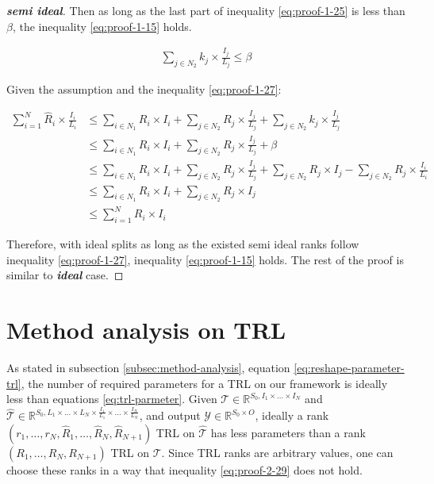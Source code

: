 \documentclass{article}
\begin{document}
\begin{proof}[\textbf{semi ideal}]
Then as long as the last part of inequality \ref{eq:proof-1-25} is less than $\beta$, the inequality \ref{eq:proof-1-15} holds.

\begin{align}
	\label{eq:proof-1-27}
	 \sum_{j\in N_2} k_j \times \frac{I_j}{L_j} \leq \beta
\end{align}

Given the assumption and the inequality \ref{eq:proof-1-27}:

\begin{align}
	\label{eq:proof-1-28}
	\sum_{i=1}^{N} \hat{R}_i \times \frac{I_i}{L_i} &\leq
	\sum_{i\in N_1} R_i \times I_i +  \sum_{j\in N_2} R_j \times \frac{I_j}{L_j} + \sum_{j\in N_2} k_j \times \frac{I_j}{L_j} 
	\nonumber\\
	&\leq
	\sum_{i\in N_1} R_i \times I_i +  \sum_{j\in N_2} R_j \times \frac{I_j}{L_j} + \beta
	\nonumber\\
	&\leq
	\sum_{i\in N_1} R_i \times I_i +  \sum_{j\in N_2} R_j \times \frac{I_j}{L_j} + \sum_{j \in N_2} R_j \times I_j -  \sum_{j\in N_2} R_j \times \frac{I_i}{L_i}
	\nonumber\\
	&\leq
	\sum_{i\in N_1} R_i \times I_i +  \sum_{j \in N_2} R_j \times I_j
	\nonumber \\
	&\leq 
	\sum_{i = 1}^{N}R_i \times I_i
\end{align}

Therefore, with ideal splits as long as the existed semi ideal ranks follow inequality \ref{eq:proof-1-27}, inequality \ref{eq:proof-1-15} holds. The rest of the proof is similar to \textit{\textbf{ideal}} case.
\end{proof}

\section{Method analysis on TRL}
\label{proof-2}
As stated in subsection \ref{subsec:method-analysis}, equation \ref{eq:reshape-parameter-trl}, the number of required parameters for a TRL on our framework is ideally less than equations \ref{eq:trl-parmeter}. Given $\mathcal{T} \in \mathbb{R}^{S_0, I_1\times\dots\times I_N}$ and $\hat{\mathcal{T}} \in \mathbb{R}^{S_0, L_1\times\dots\times L_N\times \frac{I_1}{L_1}\times\dots\times\frac{I_N}{L_N}}$, and output $\mathcal{Y} \in \mathbb{R}^{S_0\times O}$, ideally a rank $(r_1,\dots,r_N, \hat{R}_1, \dots, \hat{R}_N, \hat{R}_{N+1})$ TRL on $\hat{\mathcal{T}}$ has less parameters than a rank $(R_1,\dots,R_N, R_{N+1})$ TRL on $\mathcal{T}$. Since TRL ranks are arbitrary values, one can choose these ranks in a way that inequality \ref{eq:proof-2-29} does not hold.
\end{document}
